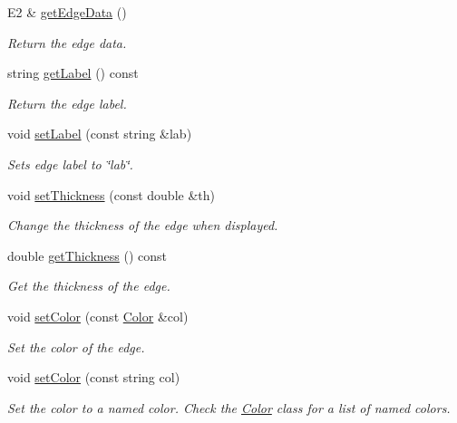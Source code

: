 \begin{DoxyCompactItemize}
E2 \& \hyperlink{classbridges_1_1datastructure_1_1_edge_a302b605a5d30387cfae8f4805c43ec41}{get\+Edge\+Data} ()
\begin{DoxyCompactList}\small\item\em Return the edge data. \end{DoxyCompactList}\item 
string \hyperlink{classbridges_1_1datastructure_1_1_edge_aad4a9a28e282e5aa5e7821a14ef94327}{get\+Label} () const
\begin{DoxyCompactList}\small\item\em Return the edge label. \end{DoxyCompactList}\item 
void \hyperlink{classbridges_1_1datastructure_1_1_edge_a5f88c4db54027da70de06f21fd5b6ccd}{set\+Label} (const string \&lab)
\begin{DoxyCompactList}\small\item\em Sets edge label to \char`\"{}lab\char`\"{}. \end{DoxyCompactList}\item 
void \hyperlink{classbridges_1_1datastructure_1_1_edge_adf4a6a3974e1fc60331f4b9d33c7b0e5}{set\+Thickness} (const double \&th)
\begin{DoxyCompactList}\small\item\em Change the thickness of the edge when displayed. \end{DoxyCompactList}\item 
double \hyperlink{classbridges_1_1datastructure_1_1_edge_a6163e53061d4785b969fa664dbae104b}{get\+Thickness} () const
\begin{DoxyCompactList}\small\item\em Get the thickness of the edge. \end{DoxyCompactList}\item 
void \hyperlink{classbridges_1_1datastructure_1_1_edge_a9eab71fed936587b2a3109d3df3c46fb}{set\+Color} (const \hyperlink{classbridges_1_1datastructure_1_1_color}{Color} \&col)
\begin{DoxyCompactList}\small\item\em Set the color of the edge. \end{DoxyCompactList}\item 
void \hyperlink{classbridges_1_1datastructure_1_1_edge_a5a38f46e9662624af4de9fcf596c4783}{set\+Color} (const string col)
\begin{DoxyCompactList}\small\item\em Set the color to a named color. Check the \hyperlink{classbridges_1_1datastructure_1_1_color}{Color} class for a list of named colors. \end{DoxyCompactList}\item 

\end{DoxyCompactItemize}
